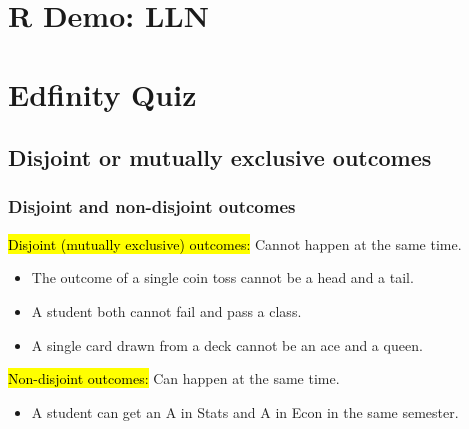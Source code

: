 \documentclass[slidestop,compress,mathserif]{beamer}
\begin{document}
\section{R Demo: LLN}


\section{Edfinity Quiz}


\subsection{Disjoint or mutually exclusive outcomes}


\begin{frame}
\frametitle{Disjoint and non-disjoint outcomes}

\begin{center}
\end{center}

\hl{Disjoint (mutually exclusive) outcomes:} Cannot happen at the same time.
\begin{itemize}
\item The outcome of a single coin toss cannot be a head and a tail.
\item A student both cannot fail and pass a class.
\item A single card drawn from a deck cannot be an ace and a queen.
\end{itemize}

\pause

\hl{Non-disjoint outcomes:} Can happen at the same time.
\begin{itemize}
\item A student can get an A in Stats and A in Econ in the same semester.
\end{itemize}

\end{frame}
\end{document}

